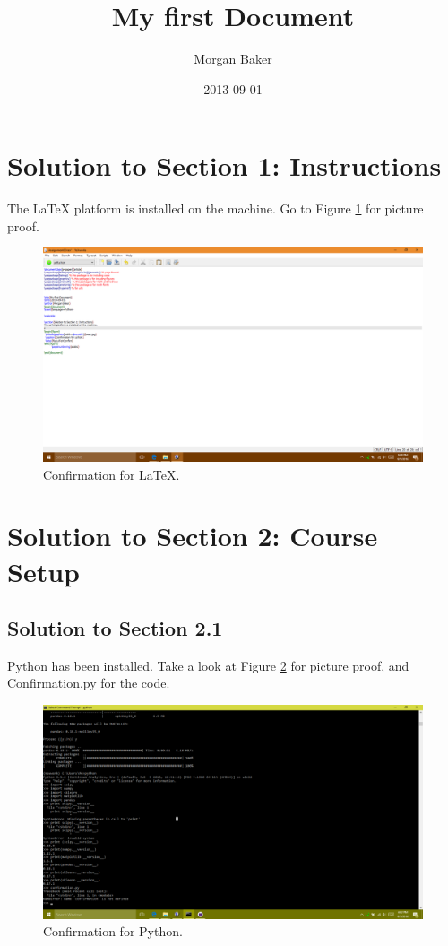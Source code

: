 \documentclass[a4paper]{article}
\title{My first Document}
\date{2013-09-01}
\author{Morgan Baker}
\begin{document}
\lstset{language=Python}
	
\maketitle

\section{Solution to Section 1: Instructions}
The LaTeX platform is installed on the machine. Go to Figure \ref{fig:LaTeXConfirm} for picture proof.

\begin{figure}
  \includegraphics[width=\linewidth]{LaTeXConfirm.png}
  \caption{Confirmation for LaTeX.}
  \label{fig:LaTeXConfirm}
\end{figure}

\section{Solution to Section 2: Course Setup}
\subsection{Solution to Section 2.1}
Python has been installed. Take a look at Figure \ref{fig:PythonConfirm} for picture proof, and Confirmation.py for the code.

\begin{figure}
  \includegraphics[width=\linewidth]{PythonConfirmation.png}
  \caption{Confirmation for Python.}
  \label{fig:PythonConfirm}
\end{figure}
\end{document}
